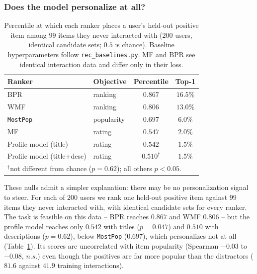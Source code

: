 \subsubsection{Does the model personalize at all?}
\label{sec:personalization}

\begin{table}[t]
    \centering
    \small
    \caption{Percentile at which each ranker places a user's held-out positive item among $99$ items they never interacted with ($200$ users, identical candidate sets; $0.5$ is chance). Baseline hyperparameters follow \texttt{rec\_baselines.py}. MF and BPR see identical interaction data and differ only in their loss.}
    \label{tab:personalization}
    \begin{tabular}{llcc}
    \toprule
    \textbf{Ranker} & \textbf{Objective} & \textbf{Percentile} & \textbf{Top-1} \\
    \midrule
    BPR                        & ranking    & $0.867$ & $16.5\%$ \\
    WMF                        & ranking    & $0.806$ & $13.0\%$ \\
    \texttt{MostPop}           & popularity & $0.697$ & \phantom{0}$6.0\%$ \\
    MF                         & rating     & $0.547$ & \phantom{0}$2.0\%$ \\
    Profile model (title)      & rating     & $0.542$ & \phantom{0}$1.5\%$ \\
    Profile model (title+desc) & rating     & $0.510^{\dagger}$ & \phantom{0}$1.5\%$ \\
    \bottomrule
    \multicolumn{4}{l}{\footnotesize $^{\dagger}$not different from chance ($p{=}0.62$); all others $p<0.05$.}
    \end{tabular}
\end{table}

These nulls admit a simpler explanation: there may be no personalization signal to steer. For each of $200$ users we rank one held-out positive item against $99$ items they never interacted with, with identical candidate sets for every ranker. The task is feasible on this data -- BPR reaches $0.867$ and WMF $0.806$ -- but the profile model reaches only $0.542$ with titles ($p{=}0.047$) and $0.510$ with descriptions ($p{=}0.62$), below \texttt{MostPop} ($0.697$), which personalizes not at all (Table~\ref{tab:personalization}). Its scores are uncorrelated with item popularity (Spearman $-0.03$ to $-0.08$, $n.s.$) even though the positives are far more popular than the distractors ($81.6$ against $41.9$ training interactions).

